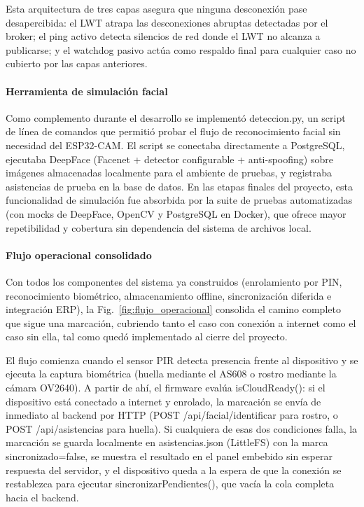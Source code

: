 Esta arquitectura de tres capas asegura que ninguna desconexión pase desapercibida: el LWT atrapa las desconexiones abruptas detectadas por el broker; el ping activo detecta silencios de red donde el LWT no alcanza a publicarse; y el watchdog pasivo actúa como respaldo final para cualquier caso no cubierto por las capas anteriores.

\paragraph{Herramienta de simulación facial}

Como complemento durante el desarrollo se implementó deteccion.py, un script de línea de comandos que permitió probar el flujo de reconocimiento facial sin necesidad del ESP32-CAM. El script se conectaba directamente a PostgreSQL, ejecutaba DeepFace (Facenet + detector configurable + anti-spoofing) sobre imágenes almacenadas localmente para el ambiente de pruebas, y registraba asistencias de prueba en la base de datos. En las etapas finales del proyecto, esta funcionalidad de simulación fue absorbida por la suite de pruebas automatizadas (con mocks de DeepFace, OpenCV y PostgreSQL en Docker), que ofrece mayor repetibilidad y cobertura sin dependencia del sistema de archivos local.

\paragraph{Flujo operacional consolidado}
\label{sec:flujo_operacional_consolidado}

Con todos los componentes del sistema ya construidos (enrolamiento por PIN, reconocimiento biométrico, almacenamiento offline, sincronización diferida e integración ERP), la Fig.~\ref{fig:flujo_operacional} consolida el camino completo que sigue una marcación, cubriendo tanto el caso con conexión a internet como el caso sin ella, tal como quedó implementado al cierre del proyecto.

El flujo comienza cuando el sensor PIR detecta presencia frente al dispositivo y se ejecuta la captura biométrica (huella mediante el AS608 o rostro mediante la cámara OV2640). A partir de ahí, el firmware evalúa isCloudReady(): si el dispositivo está conectado a internet y enrolado, la marcación se envía de inmediato al backend por HTTP (POST /api/facial/identificar para rostro, o POST /api/asistencias para huella). Si cualquiera de esas dos condiciones falla, la marcación se guarda localmente en asistencias.json (LittleFS) con la marca sincronizado=false, se muestra el resultado en el panel embebido sin esperar respuesta del servidor, y el dispositivo queda a la espera de que la conexión se restablezca para ejecutar sincronizarPendientes(), que vacía la cola completa hacia el backend.

